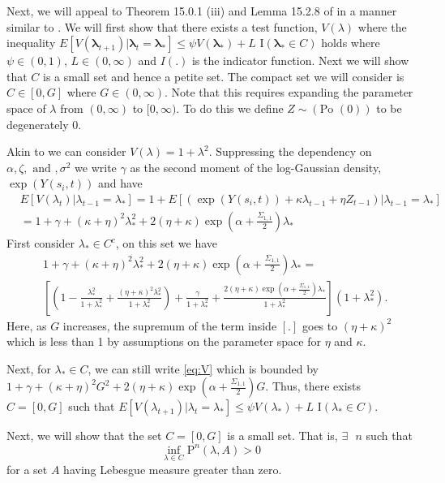 \documentclass[11pt]{isuthesis}
\begin{document}
Next, we will appeal to Theorem 15.0.1 (iii) and Lemma 15.2.8 of \cite{meyn2012markov} in a manner similar to \cite{fokianos2009poisson}. We will first show that there exists a test function, $V(\lambda)$ where the inequality $E[V(\boldsymbol{\lambda}_{t+1})|\boldsymbol{\lambda}_t=\boldsymbol{\lambda_*}]\leq \psi V(\boldsymbol{\lambda_*})+L \mbox{ I}(\boldsymbol{\lambda_*} \in C)$ holds where $\psi \in (0,1)$, $L \in (0,\infty)$ and $I(.)$ is the indicator function.  Next we will show that $C$ is a small set and hence a petite set. The compact set we will consider is $C \in [0,G]$ where  $G \in (0,\infty)$.  Note that this requires expanding the parameter space of $\lambda$ from $(0,\infty)$ to $[0,\infty)$.  To do this we define $Z\sim(\mbox{Po }(0))$ to be degenerately $0$.

Akin to \cite{fokianos2009poisson} we can consider $V(\lambda)=1+\lambda^2$.  Suppressing the dependency on $\alpha, \zeta,\mbox{ and },\sigma^2$ we write $\gamma$ as the second moment of the log-Gaussian density, $\exp(Y(s_i,t))$ and have
\begin{align}
	& E[V(\lambda_t)|\lambda_{t-1}=\lambda_*]= 1+E[\left(\exp(Y(s_i,t))+\kappa\lambda_{t-1}+\eta Z_{t-1}\right)|\lambda_{t-1}=\lambda_*]\\
	& = 1+\gamma+(\kappa+\eta)^2\lambda_*^2+2(\eta+\kappa)\exp(\alpha+\frac{\Sigma_{1,1}}{2})\lambda_* \label{eq:V}
\end{align}
First consider $\lambda_* \in C^c$, on this set we have
\begin{align}
	& 1+\gamma+(\kappa+\eta)^2\lambda_*^2+2(\eta+\kappa)\exp(\alpha+\frac{\Sigma_{1,1}}{2})\lambda_* =\nonumber\\ & \left[\left(1-\frac{\lambda_*^2}{1+\lambda_*^2}+\frac{(\eta+\kappa)^2 \lambda_*^2}{1+\lambda_*^2}\right) + \frac{\gamma}{1+\lambda_*^2}+\frac{2(\eta+\kappa)\exp(\alpha+\frac{\Sigma_{1,1}}{2})\lambda_*}{1+\lambda_*^2}\right](1+\lambda_*^2).
\end{align}
Here, as $G$ increases, the supremum of the term inside $\left[.\right]$ goes to $(\eta+\kappa)^2$ which is less than 1 by assumptions on the parameter space for $\eta$ and $\kappa$.  

Next, for $\lambda_* \in C$, we can still write \eqref{eq:V} which is bounded by $1+\gamma+(\kappa+\eta)^2 G^2 + 2(\eta+\kappa)\exp(\alpha+\frac{\Sigma_{1,1}}{2})G$.  Thus, there exists $C=[0,G]$ such that $E[V(\lambda_{t+1})|\lambda_t=\lambda_*]\leq \psi V(\lambda_*)+L \mbox{ I}(\lambda_*\in C)$.

Next, we will show that the set $C=[0,G]$ is a small set.  That is, $\exists \mbox{ }n$ such that
\begin{equation}
	\inf_{\lambda \in C}\mbox{P}^n(\lambda,A)>0
\end{equation}
for a set $A$ having Lebesgue measure greater than zero.
\end{document}
